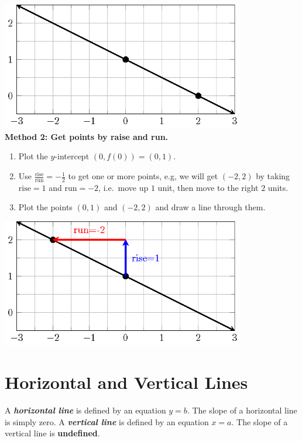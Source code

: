 \documentclass[en,12pt]{elegantbook}
\providecommand{\tightlist}{%
  \setlength{\itemsep}{0pt}\setlength{\parskip}{0pt}}
\begin{document}
\includegraphics[width=0.8\textwidth,height=\textheight]{figs/tikz-linear-function-example-a.png}\\

\textbf{Method 2: Get points by raise and run.}

\begin{enumerate}
\def\labelenumi{\arabic{enumi}.}
\tightlist
\item
  Plot the \(y\)-intercept \((0, f(0))=(0, 1)\).
\item
  Use \(\frac{\text{rise}}{\text{run}}=-\frac{1}{2}\) to get one or more points, e.g, we will get \((-2, 2)\) by taking \(\text{rise}=1\) and \(\text{run}=-2\), i.e.~move up \(1\) unit, then move to the right \(2\) units.
\item
  Plot the points \((0, 1)\) and \((-2, 2)\) and draw a line through them.
\end{enumerate}

\includegraphics[width=0.8\textwidth,height=\textheight]{figs/tikz-linear-function-example-b.png}\\

\hypertarget{horizontal-and-vertical-lines}{%
\section{Horizontal and Vertical Lines}\label{horizontal-and-vertical-lines}}

A \textbf{\emph{horizontal line}} is defined by an equation \(y=b\). The slope of a horizontal line is simply zero.
A \textbf{\emph{vertical line}} is defined by an equation \(x=a\). The slope of a vertical line is \textbf{undefined}.
\end{document}
